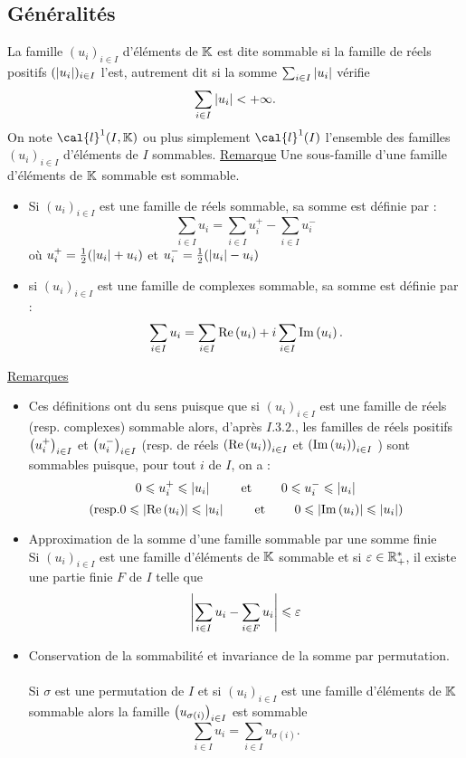 \subsection{Généralités}
\begin{defprop}[Sommabilité]
    
    La famille \((u_i)_{i\in I}\) d’éléments de \(\mathbb{K}\)   est dite sommable si la famille de réels positifs \((\left\lvert u_i\right\rvert)_{i\in I}\) l’est, autrement dit si la somme \(\sum_{i\in I}\left\lvert u_i\right\rvert\) vérifie
    \[\sum_{i\in I}\left\lvert u_i\right\rvert < +\infty .\]
    On note \(\cal{l}^1(I, \K  )\) ou plus simplement \(\cal{l}^1(I)\) l’ensemble des familles \((u_i)_{i\in I}\) d’éléments de \(I\) sommables.
    \underline{Remarque}
    Une sous-famille d’une famille d’éléments de \(\mathbb{K}\) sommable est sommable.
\end{defprop}
\begin{defprop}
    \begin{itemize}
        \item Si \((u_i)_{i\in I}\) est une famille de réels sommable, sa somme est définie par :
            \[\sum_{i\in I}u_i = \sum_{i\in I}u^{+}_i - \sum_{i\in I}u^{-}_i\]
        où \(u^{+}_i = \frac{1}{2} (\left\lvert u_i\right\rvert + u_i)\) et \(u^{-}_i = \frac{1}{2} (\left\lvert u_i\right\rvert - u_i)\)
        \item si \((u_i)_{i\in I}\) est une famille de complexes sommable, sa somme est définie par :
            \[\sum_{i\in I}u_i = \sum_{i\in I}\operatorname{Re}\left(u_i\right) + i\sum_{i\in I}\operatorname{Im}\left(u_i\right).\]
    \end{itemize}
    \underline{Remarques}
    \begin{itemize}
        \item Ces définitions ont du sens puisque que si \((u_i)_{i\in I}\) est une famille de réels (resp. complexes) sommable alors, d’après \(I. 3. 2.\), les familles de réels positifs \(\left(u^{+}_i\right)_{i\in I}\) et \(\left(u^{-}_i\right)_{i\in I}\) (resp. de réels \(\left(\operatorname{Re}\left(u_i\right)\right)_{i\in I}\) et \(\left(\operatorname{Im}\left(u_i\right)\right)_{i\in I}\) ) sont sommables puisque, pour tout \(i\) de \(I\), on a :
        \[0 \leqslant  u^{+}_i \leqslant  \left\lvert u_i\right\rvert\qquad \text{ et } \qquad 0 \leqslant  u^{-}_i \leqslant  \left\lvert u_i\right\rvert\]
        \[(\text{resp.} 0 \leqslant  \left\lvert\operatorname{Re}\left(u_i\right)\right\rvert \leqslant  \left\lvert u_i\right\rvert \qquad \text{ et } \qquad 0 \leqslant  \left\lvert\operatorname{Im}\left(u_i\right)\right\rvert \leqslant  \left\lvert u_i\right\rvert)\]
        \item Approximation de la somme d’une famille sommable par une somme finie\\
        Si \((u_i)_{i\in I}\) est une famille d’éléments de \(\mathbb{K}\)   sommable et si \(\varepsilon \in  \mathbb{R}_+^*\), il existe une partie finie \(F\) de \(I\) telle que
        \[\left\lvert\sum_{i\in I}u_i - \sum_{i\in F}u_i\right\rvert \leqslant \varepsilon\]
        \item Conservation de la sommabilité et invariance de la somme par permutation.\\~\\
        Si \(\sigma\) est une permutation de \(I\) et si \((u_i)_{i\in I}\) est une famille d’éléments de \(\mathbb{K} \)  sommable alors la famille \(\left(u_{\sigma(i)}\right)_{i\in I}\) est sommable \[\sum_{i\in I}u_i = \sum_{i\in I}u_{\sigma(i)}.\]
    \end{itemize}
\end{defprop}
